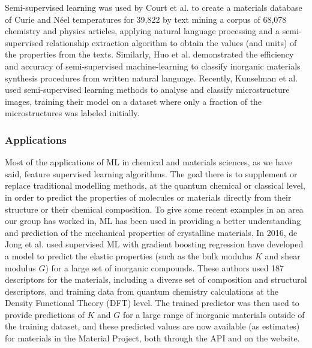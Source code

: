 \documentclass[aip,apm,amsmath,amssymb,reprint]{revtex4-2}
\begin{document}
Semi-supervised learning was used by Court et al. to create a materials database of Curie and N{\'e}el temperatures for 39,822 by text mining a corpus of 68,078 chemistry and physics articles, applying natural language processing and a semi-supervised relationship extraction algorithm to obtain the values (and units) of the properties from the texts.\cite{Court2018} Similarly, Huo et al. demonstrated the efficiency and accuracy of semi-supervised machine-learning to classify inorganic materials synthesis procedures from written natural language.\cite{Huo2019} Recently, Kunselman et al. used semi-supervised learning methods to analyse and classify microstructure images, training their model on a dataset where only a fraction of the microstructures was labeled initially.\cite{Kunselman2020}


\subsubsection{Applications}

Most of the applications of ML in chemical and materials sciences, as we have said, feature supervised learning algorithms. The goal there is to supplement or replace traditional modelling methods, at the quantum chemical or classical level, in order to predict the properties of molecules or materials directly from their structure or their chemical composition. To give some recent examples in an area our group has worked in, ML has been used in providing a better understanding and prediction of the mechanical properties of crystalline materials. In 2016, de Jong et al. used supervised ML with gradient boosting regression have developed a model to predict the elastic properties (such as the bulk modulus $K$ and shear modulus $G$) for a large set of inorganic compounds.\cite{deJong2016} These authors used 187 descriptors for the materials, including a diverse set of composition and structural descriptors, and training data from quantum chemistry calculations at the Density Functional Theory (DFT) level. The trained predictor was then used to provide predictions of $K$ and $G$ for a large range of inorganic materials outside of the training dataset, and these predicted values are now available (as estimates) for materials in the Material Project,\cite{MaterialsProject} both through the API and on the website.
\end{document}
